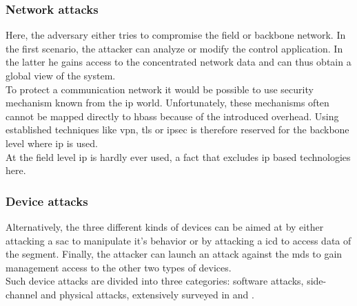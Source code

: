 \subsubsection{Network attacks}
Here, the adversary either tries to compromise the field or backbone network. In the first scenario, the attacker can analyze or modify the control application. In the latter he
gains access to the concentrated network data and can thus obtain a global view of the system.
\\
To protect a communication network it would be possible to use security mechanism known from the \gls{ip} world. 
Unfortunately, these mechanisms often cannot be mapped directly to \glspl{hbas} because of the introduced overhead. Using
established techniques like \gls{vpn}, \gls{tls} or \gls{ipsec} is therefore reserved for the backbone level where \gls{ip} is used.
\\
At the field level \gls{ip} is hardly ever used, a fact that excludes \gls{ip} based technologies here.

\subsubsection{Device attacks}
Alternatively, the three different kinds of devices can be aimed at by either attacking a \gls{sac} to manipulate it's behavior or by attacking a \gls{icd} to access data of the segment.
Finally, the attacker can launch an attack against the \glspl{md} to gain management access to the other two types of devices.
\\
Such device attacks are divided into three categories: software attacks, side-channel and physical attacks, extensively surveyed in \cite{5332331} and \cite{secAn}.
